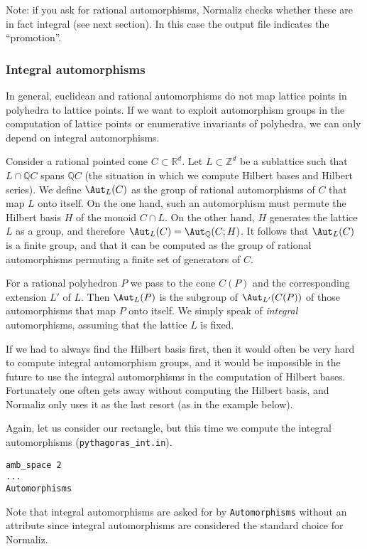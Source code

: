 \documentclass[12pt,a4paper]{scrartcl}
\theoremstyle{definition}
\def\ZZ{{\mathbb Z}}
\def\QQ{{\mathbb Q}}
\def\RR{{\mathbb R}}
\begin{document}
{Note: if you ask for rational automorphisms, Normaliz checks whether these are in fact integral (see next section). In this case the output file indicates the ``promotion''.

\subsubsection{Integral automorphisms}

In general, euclidean and rational automorphisms do not map lattice points in polyhedra to lattice points. If we want to exploit automorphism groups in the computation of lattice points or enumerative invariants of polyhedra, we can only depend on integral automorphisms.

Consider a rational pointed cone $C\subset\RR^d$. Let $L\subset\ZZ^d$ be a sublattice such that $L\cap \QQ C$ spans $\QQ C$ (the situation in which we compute Hilbert bases and Hilbert series). We define $\Aut_L(C)$ as the group of rational automorphisms of $C$ that map $L$ onto itself. On the one hand,  such an automorphism must permute the Hilbert basis $H$ of the monoid $C\cap L$. On the other hand, $H$ generates the lattice $L$ as a group, and therefore $\Aut_L(C)=\Aut_\QQ(C;H)$. It follows that $\Aut_L(C)$ is a finite group, and that it can be computed as the group of rational automorphisms permuting a finite set of generators of $C$.

For a rational polyhedron $P$ we pass to the cone $C(P)$ and the corresponding extension $L'$ of $L$. Then $\Aut_L(P)$ is the subgroup of $\Aut_{L'}(C(P))$ of those automorphisms that map $P$ onto itself. We simply speak of \emph{integral} automorphisms, assuming that the lattice $L$ is fixed. 

 If we had to always find the Hilbert basis first, then it would often be very hard to compute integral automorphism groups, and it would be impossible in the future to use the integral automorphisms in the computation of Hilbert bases. Fortunately one often gets away without computing the Hilbert basis, and Normaliz only uses it as the last resort (as in the example below).

Again, let us consider our rectangle, but this time we compute the integral automorphisms (\verb|pythagoras_int.in|). 
\begin{Verbatim}
amb_space 2
...
Automorphisms
\end{Verbatim}
Note that integral automorphisms are asked for by \verb|Automorphisms| without an attribute since integral automorphisms are considered the standard choice for Normaliz.

}
\end{document}
